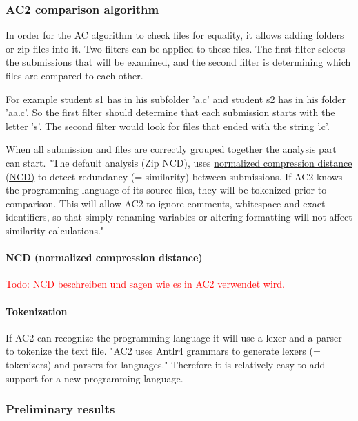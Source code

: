 \documentclass[a4paper, 11pt]{article}
\renewcommand{\\}{\vspace*{0.5\baselineskip} \newline}
\begin{document}
\subsubsection{AC2 comparison algorithm}
\label{sec:AC2ComparisonAlgorithm}

In order for the AC algorithm to check files for equality, it allows adding folders or zip-files into it. Two filters can be applied to these files. The first filter selects the submissions that will be examined, and the second filter is determining which files are compared to each other. 

For example student s1 has in his subfolder 'a.c' and student s2 has in his folder 'aa.c'. So the first filter should determine that each submission starts with the letter 's'. The second filter would look for files that ended with the string '.c'.

When all submission and files are correctly grouped together the analysis part can start. "The default analysis (Zip NCD), uses \hyperref[sec:NCD]{normalized compression distance (NCD)} to detect redundancy (= similarity) between submissions. If AC2 knows the programming language of its source files, they will be tokenized prior to comparison. This will allow AC2 to ignore comments, whitespace and exact identifiers, so that simply renaming variables or altering formatting will not affect similarity calculations." \autocite{AC2wiki} 

\paragraph{NCD (normalized compression distance)}
\label{sec:NCD}

\textcolor{red}{Todo: NCD beschreiben und sagen wie es in AC2 verwendet wird.}

\paragraph{Tokenization}

If AC2 can recognize the programming language it will use a lexer and a parser to tokenize the text file. "AC2 uses Antlr4 grammars to generate lexers (= tokenizers) and parsers for languages." \autocite{AC2wiki} Therefore it is relatively easy to add support for a new programming language.

\subsubsection{Preliminary results}
\end{document}
